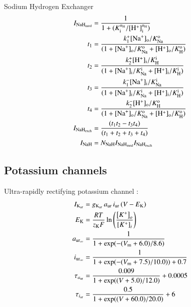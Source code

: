 Sodium Hydrogen Exchanger \citep[Eq. 2, pp. 2675]{Chaetal2009}
\begin{equation}
  \begin{split}
    I_{{\rm NaH}_{\rm mod}} & = \frac{1}{1 + (K_{\rm i}^{n_{\rm
          H}}/[{\rm H}^{+}]_{\rm i}^{n_{\rm H}})}\\
    t_{1} & = \frac{k_{1}^{+} [{\rm Na}^{+}]_{\rm o}/K_{\rm Na}^{\rm
        o}} {(1 + [{\rm Na}^{+}]_{\rm o}/K_{\rm Na}^{\rm o} + [{\rm
        H}^{+}]_{\rm o} /K_{\rm H}^{\rm o})}\\
    t_{2} & = \frac{k_{2}^{+} [{\rm H}^{+}]_{\rm i}/K_{\rm H}^{\rm i}}
    {(1 + [{\rm Na}^{+}]_{\rm i}/K_{\rm Na}^{\rm i} + [{\rm
        H}^{+}]_{\rm i}/K_{\rm H}^{\rm i})}\\
    t_{3} & = \frac{k_{1}^{-} [{\rm Na}^{+}]_{\rm i}/K_{\rm Na}^{\rm
        i}} {(1 + [{\rm Na}^{+}]_{\rm i}/K_{\rm Na}^{\rm i} + [{\rm
        H}^{+}]_{\rm i} /K_{\rm H}^{\rm i})}\\
    t_{4} & = \frac{k_{2}^{-} [{\rm H}^{+}]_{\rm o}/K_{\rm H}^{\rm
        o}} {(1 + [{\rm Na}^{+}]_{\rm o}/K_{\rm Na}^{\rm o} + [{\rm
        H}^{+}]_{\rm o} /K_{\rm H}^{\rm o})}\\
    I_{{\rm NaH}_{\rm exch}} & = \frac{(t_1 t_2 - t_3 t_4)}
    {(t_1 + t_2 + t_3 + t_4)}\\
    I_{\rm NaH} & = N_{\rm NaH} I_{\rm NaH_{\rm mod}}
    I_{\rm NaH_{\rm exch}}
  \end{split}
\end{equation}

\subsection{Potassium channels}
\label{sec:potassium-channels}

Ultra-rapidly rectifying potassium channel \citep{Maleckaretal2009}:
\begin{equation}
  \begin{split}
    I_{\rm K_{\rm ur}} & = g_{\rm K_{\rm ur}}\, a_{\rm ur}\, i_{\rm
      ur}\, (V - E_{\rm K})\\
    E_{\rm K} & =  \frac{R T}{z_{\rm K} F}
    \ln\left(\frac{\left[K^{+}\right]_{o}}
      {\left[K^{+}\right]_{i}}\right)\\
    a_{{\rm ur}_{\infty}} & = \frac{1}{1 + \exp(-(V_{\rm m} +
      6.0)/8.6)}\\
    i_{{\rm ur}_{\infty}} & = \frac{1}{1 + \exp(-(V_{\rm m} +
      7.5)/10.0)) + 0.7}\\
    \tau_{a_{\rm ur}} & = \frac{0.009}{1 + \exp((V + 5.0)/12.0)} +
    0.0005\\
    \tau_{i_{\rm ur}} & = \frac{0.5}{1 + \exp((V +60.0)/20.0)} +
    6\\
  \end{split}
\end{equation}

